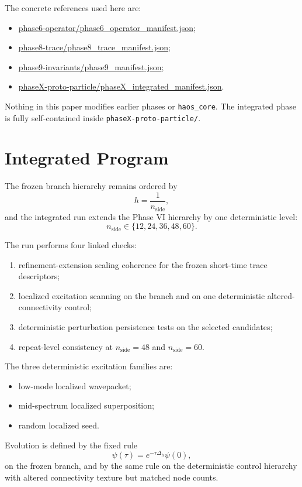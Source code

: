 \documentclass[11pt]{article}
\begin{document}
The concrete references used here are:
\begin{itemize}
\item \url{phase6-operator/phase6_operator_manifest.json};
\item \url{phase8-trace/phase8_trace_manifest.json};
\item \url{phase9-invariants/phase9_manifest.json};
\item \url{phaseX-proto-particle/phaseX_integrated_manifest.json}.
\end{itemize}

Nothing in this paper modifies earlier phases or \texttt{haos\_core}. The integrated phase is fully self-contained inside \texttt{phaseX-proto-particle/}.

\section{Integrated Program}

The frozen branch hierarchy remains ordered by
\[
h = \frac{1}{n_{\mathrm{side}}},
\]
and the integrated run extends the Phase VI hierarchy by one deterministic level:
\[
n_{\mathrm{side}} \in \{12,24,36,48,60\}.
\]

The run performs four linked checks:
\begin{enumerate}
\item refinement-extension scaling coherence for the frozen short-time trace descriptors;
\item localized excitation scanning on the branch and on one deterministic altered-connectivity control;
\item deterministic perturbation persistence tests on the selected candidates;
\item repeat-level consistency at $n_{\mathrm{side}}=48$ and $n_{\mathrm{side}}=60$.
\end{enumerate}

The three deterministic excitation families are:
\begin{itemize}
\item low-mode localized wavepacket;
\item mid-spectrum localized superposition;
\item random localized seed.
\end{itemize}

Evolution is defined by the fixed rule
\[
\psi(\tau) = e^{-\tau \Delta_h}\psi(0),
\]
on the frozen branch, and by the same rule on the deterministic control hierarchy with altered connectivity texture but matched node counts.
\end{document}
